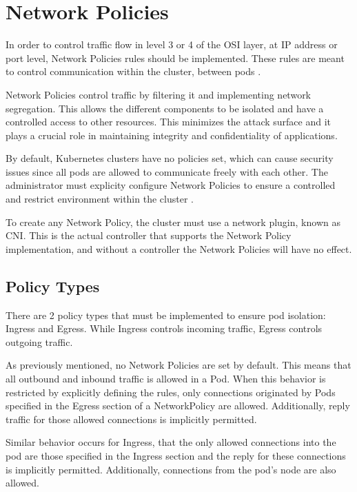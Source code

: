 \documentclass[a4paper,11pt,openright,BCOR=15mm]{scrbook}
\begin{document}
	\section{Network Policies}
	
In order to control traffic flow in level 3 or 4 of the OSI layer, at IP address or port level, Network Policies rules should be implemented. These rules are meant to control communication within the cluster, between pods \cite{network_policies_kubernetes_from_kubernetes_io}. 

Network Policies control traffic by filtering it and implementing network segregation. This allows the different components to be isolated and have a controlled access to other resources. This minimizes the attack surface and it plays a crucial role in maintaining integrity and confidentiality of applications.

By default, Kubernetes clusters have no policies set, which can cause security issues since all pods are allowed to communicate freely with each other. The administrator must explicity configure Network Policies to ensure a controlled and restrict environment within the cluster \cite{amaechi_learn_2023}.

To create any Network Policy, the cluster must use a network plugin, known as CNI. This is the actual controller that supports the Network Policy implementation, and without a controller the Network Policies will have no effect.

\subsection{Policy Types}

There are 2 policy types that must be implemented to ensure pod isolation: Ingress and Egress. While Ingress controls incoming traffic, Egress controls outgoing traffic.

As previously mentioned, no Network Policies are set by default. This means that all outbound and inbound traffic is allowed in a Pod. When this behavior is restricted by explicitly defining the rules, only connections originated by Pods specified in the Egress section of a NetworkPolicy are allowed. Additionally, reply traffic for those allowed connections is implicitly permitted. \cite{walker_kubernetes_2023}

Similar behavior occurs for Ingress, that the only allowed connections into the pod are those specified in the Ingress section and the reply for these connections is implicitly permitted. Additionally, connections from the pod's node are also allowed.
\end{document}
